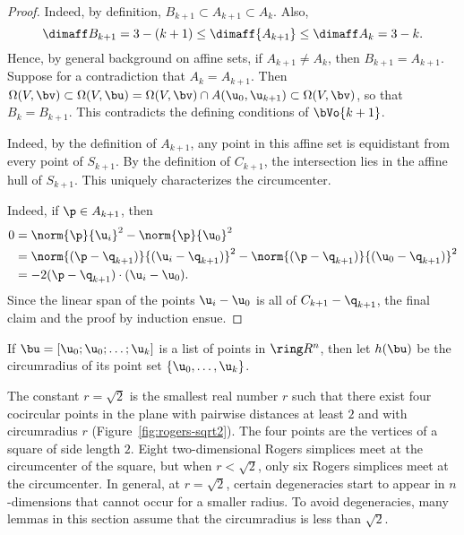 \begin{cnl}
\begin{proof}
  Indeed, by definition,
$B_{k+1}\subset A_{k+1}\subset A_k$.  Also,
\[  
\dimaff B_{k+1} = 3 - (k+1) \le \dimaff{A_{k+1}} \le \dimaff A_k = 3 - k.
\] 
Hence, by general background on affine sets, if $A_{k+1}\ne A_k$, then
$B_{k+1}=A_{k+1}$.  Suppose for a contradiction that $A_k =
A_{k+1}$.  Then $\Omega(V,\bv) \subset \Omega(V,\bu) =
\Omega(V,\bv)\cap \AA{\u_0}{\u_{k+1}} \subset \Omega(V,\bv)$, so that
$B_k = B_{k+1}$.  This contradicts the defining conditions of
$\bVo{k+1}$.

  Indeed, by the
definition of $A_{k+1}$, any point in this affine set is equidistant
from every point of $S_{k+1}$.  By the definition of $C_{k+1}$, the
intersection lies in the affine hull of $S_{k+1}$.  This uniquely
characterizes the circumcenter.

Indeed, if $\p\in A_{k+1}$, then
\begin{align*} 
0 &=\norm{\p}{\u_i}^2 -\norm{\p}{\u_0}^2\\
&=\norm{(\p-\q_{k+1})}{(\u_i-\q_{k+1})}^2 -\norm{(\p-\q_{k+1})}{(\u_0-\q_{k+1})}^2\\
&=-2 (\p-\q_{k+1})\cdot (\u_i-\u_0).
\end{align*}
Since the linear span of the points $\u_i-\u_0$ is all of
$C_{k+1}-\q_{k+1}$, the final claim and the  proof by induction ensue.
\end{proof}


\begin{definition}[h]
\label{def:h,hl}
%
If $\bu=[\u_0;\u_0;\ldots;\u_k]$ is a list of points in $\vecR{n}$, then
let $h(\bu)$ be the
circumradius of its point set $\setenumdots{\u}{0}{k}$.
\end{definition}


\begin{remark}
The constant $r=\sqrt2$ is the smallest real number $r$ such that
there exist four cocircular points in the plane with pairwise
distances at least $2$ and with circumradius $r$
(Figure~\ref{fig:rogers-sqrt2}).  The four points are the vertices of
a square of side length $2$.  Eight two-dimensional Rogers simplices
meet at the circumcenter of the square, but when $r<\sqrt2$, only six
Rogers simplices meet at the circumcenter.  In general, at $r=\sqrt2$,
certain degeneracies start to appear in $n$-dimensions that cannot
occur for a smaller radius.  To avoid degeneracies, many lemmas in
this section assume that the circumradius is less than $\sqrt2$.
\end{remark}


\end{cnl}
